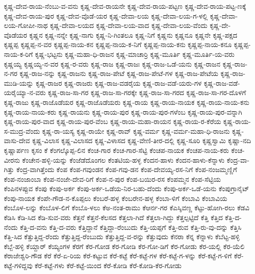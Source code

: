 ಕೃಷ್ಣ-ದೇವ-ರಾಯ-ನೆಂಬು-ವ-ವನು
ಕೃಷ್ಣ-ದೇವ-ರಾಯನೇ
ಕೃಷ್ಣ-ದೇವ-ರಾಯ-ಪಟ್ಟಣ
ಕೃಷ್ಣ-ದೇವ-ರಾಯ-ಪಟ್ಟ-ಣಕ್ಕೆ
ಕೃಷ್ಣ-ದೇವ-ರಾಯ-ಪುರ
ಕೃಷ್ಣ-ದೇವ-ವೊಡೆ-ಯರ
ಕೃಷ್ಣ-ದೇವಾ-ಲಯ
ಕೃಷ್ಣ-ದೇವಾ-ಲಯ-ಗ-ಳಲ್ಲಿ
ಕೃಷ್ಣ-ದೇವಾ-ಲಯ-ಗೋಪೀ-ನಾಥ
ಕೃಷ್ಣ-ದೇವಾ-ಲಯದ
ಕೃಷ್ಣ-ದೇವಾ-ಲಯ-ವಾದ
ಕೃಷ್ಣ-ದೇವಾ-ಲಯ-ವೆಂದು
ಕೃಷ್ಣ-ದೇ-ವೊಡೆಯರ
ಕೃಷ್ಣನ
ಕೃಷ್ಣ-ನನ್ನೇ
ಕೃಷ್ಣ-ನಾಗು
ಕೃಷ್ಣ-ನಿ-ಗಿಂತಲೂ
ಕೃಷ್ಣ-ನಿಗೆ
ಕೃಷ್ಣನು
ಕೃಷ್ಣನೂ
ಕೃಷ್ಣನೇ
ಕೃಷ್ಣ-ಪಕ್ಷದ
ಕೃಷ್ಣಪ್ಪ
ಕೃಷ್ಣಪ್ಪ-ನ-ವರ
ಕೃಷ್ಣಪ್ಪ-ನಾಯ-ಕನ
ಕೃಷ್ಣಪ್ಪ-ನಾಯ-ಕ-ನಿಗೆ
ಕೃಷ್ಣಪ್ಪ-ನಾಯ-ಕನು
ಕೃಷ್ಣಪ್ಪ-ನಾಯ-ಕನೂ
ಕೃಷ್ಣಪ್ಪ-ನಾಯ-ಕ-ರಿಗೆ
ಕೃಷ್ಣ-ಭಟ್ಟನು
ಕೃಷ್ಣ-ಮಹಾ-ಧಿ-ರಾಜನ
ಕೃಷ್ಣ-ಮಾಚಾರ್ರಿ
ಕೃಷ್ಣ-ಮೂರ್ತಿ
ಕೃಷ್ಣ-ಮೂರ್ತಿ-ಯ-ವರು
ಕೃಷ್ಣಯ್ಯ
ಕೃಷ್ಣಯ್ಯ-ನ-ವರ
ಕೃಷ್ಣ-ರ-ವರು
ಕೃಷ್ಣ-ರಾಜ
ಕೃಷ್ಣ-ರಾಜಃ
ಕೃಷ್ಣ-ರಾಜ-ಒಡೆ-ಯನು
ಕೃಷ್ಣ-ರಾಜನ
ಕೃಷ್ಣ-ರಾಜ-ನ-ಗರ
ಕೃಷ್ಣ-ರಾಜ-ನನ್ನು
ಕೃಷ್ಣ-ರಾಜನು
ಕೃಷ್ಣ-ರಾಜ-ಪೇಟೆ
ಕೃಷ್ಣ-ರಾಜ-ಪೇಟೆ-ಗಳ
ಕೃಷ್ಣ-ರಾಜ-ಪೇಟೆಯ
ಕೃಷ್ಣ-ರಾಜ-ಮುಡಿ-ಯನ್ನು
ಕೃಷ್ಣ-ರಾಜರ
ಕೃಷ್ಣ-ರಾಜರು
ಕೃಷ್ಣ-ರಾಜ-ವಡರೈಯ
ಕೃಷ್ಣ-ರಾಜ-ವಡೆ-ಯರು-ಗಳ
ಕೃಷ್ಣ-ರಾಜ-ವಡೆ-ಯರೈಯ್ಯಾ-ನ-ವರು
ಕೃಷ್ಣ-ರಾಜ-ಸಾ-ಗರ
ಕೃಷ್ಣ-ರಾಜ-ಸಾ-ಗರಕ್ಕೇ
ಕೃಷ್ಣ-ರಾಜ-ಸಾ-ಗರದ
ಕೃಷ್ಣ-ರಾಜ-ಸಾ-ಗರ-ದೊಳಗೆ
ಕೃಷ್ಣ-ರಾಜು
ಕೃಷ್ಣ-ರಾಜೊಡೆಯರ
ಕೃಷ್ಣ-ರಾಜೊಡೆಯರು
ಕೃಷ್ಣ-ರಾಯ
ಕೃಷ್ಣ-ರಾಯ-ನಾಯಕ
ಕೃಷ್ಣ-ರಾಯ-ನಾಯ-ಕನು
ಕೃಷ್ಣ-ರಾಯ-ನಾಯ-ಕರು
ಕೃಷ್ಣ-ರಾಯನು
ಕೃಷ್ಣ-ರಾಯ-ಪುರ
ಕೃಷ್ಣ-ರಾಯ-ಪುರ-ಗಳೆಂಬ
ಕೃಷ್ಣ-ರಾಯ-ಪುರ-ವನ್ನಾಗಿ
ಕೃಷ್ಣ-ರಾಯ-ಪುರ-ವಾದ
ಕೃಷ್ಣ-ರಾಯ-ಪುರ-ವೆಂಬ
ಕೃಷ್ಣ-ರಾಯ-ಮಹಾ-ರಾಯನ
ಕೃಷ್ಣ-ರಾಯ-ರ-ಕೆರೆಯ
ಕೃಷ್ಣ-ರಾಯ-ಸ-ಮುದ್ರ-ವೆಂದು
ಕೃಷ್ಣ-ರಾ-ಯಸ್ಯ
ಕೃಷ್ಣ-ರಾಯೇ
ಕೃಷ್ಣ-ರಾವ್
ಕೃಷ್ಣ-ವರ್ಮ
ಕೃಷ್ಣ-ವರ್ಮ-ಮಹಾ-ಧಿ-ರಾಜನು
ಕೃಷ್ಣ-ವಾಸು-ದೇವ
ಕೃಷ್ಣ-ವಿಲಾಸ
ಕೃಷ್ಣ-ವಿಲಾಸದ
ಕೃಷ್ಣ-ವಿಳಾಸದ
ಕೃಷ್ಣ-ವೇಣಿ-ತೀರ-ದಲ್ಲಿ
ಕೃಷ್ಣ-ಸೂರಿ
ಕೃಷ್ಣಸ್ವಾಮಿ
ಕೃಷ್ಣಾ-ನದಿ
ಕೃಷ್ಣಾರ್ಪಣ
ಕೃಸಂ
ಕೆ
ಕೆಂಗಲ್ಕೊಪ್ಪ-ಲಿನ
ಕೆಂಚ-ಗಾರ
ಕೆಂಚ-ಗಾರ-ಸೆಟ್ಟಿ
ಕೆಂಚಪ-ನಾಯಕ
ಕೆಂಚಪ-ನಾಯ-ಕರು
ಕೆಂಚ-ವೀರನು
ಕೆಂಚೇನ-ಹಳ್ಳಿ-ಯನ್ನು
ಕೆಂಜೆಡೆದೊಂಗಲ
ಕೆಂತಟಿಯ-ಹಳ್ಳ
ಕೆಂದನ-ಹಾಳು
ಕೆಂದನ-ಹಾಳು-ಕೆನ್ನಾಳು
ಕೆಂದ್ರ-ವಾ-ಗಿತ್ತು
ಕೆಂದ್ರ-ವಾಗಿತ್ತೆಂದು
ಕೆಂಪ
ಕೆಂಪ-ಗವುಂಡನ
ಕೆಂಪ-ಗವು-ಡನ
ಕೆಂಪ-ದೇವಯ್ಯ-ರಸ-ನಿಗೆ
ಕೆಂಪ-ನಂಜಮ್ಮಣ್ಣಿಗೆ
ಕೆಂಪ-ನಂಜಾಂಬಾ
ಕೆಂಪ-ನಂಜೇ-ದೇವ-ರಿಗೆ
ಕೆಂಪ-ನ-ಪುರ
ಕೆಂಪ-ಬಯಿರ-ರಸ
ಕೆಂಪಮ್ಮನ
ಕೆಂಪ-ಸೆಟ್ಟಿಯ
ಕೆಂಪಿನಳಪ್ಪುವ
ಕೆಂಪು
ಕೆಂಪು-ಅರ್ಕ
ಕೆಂಪು-ಅರ್ಕ-ಒಡೆಯ-ನಿರ-ಬಹು-ದೆಂದು
ಕೆಂಪು-ಅರ್ಕ-ಒಡೆ-ಯನು
ಕೆಂಪುಗ್ರಾನೈಟ್
ಕೆಂಪು-ನಾಯಕ
ಕೆಂಪೇ-ಗೌಡ-ನ-ಕೊಪ್ಪಲು
ಕೆಂಬರೆ-ಹಳ್ಳ
ಕೆಂಬರೇನ-ಹಳ್ಳ
ಕೆಂಬಾ-ಳಿಗೆ
ಕೆಂಬಾವಿ
ಕೆಂಬಾವಿಯ
ಕೆಂಬೊಳ-ಲನ್ನು
ಕೆಂಬೊಳ-ಲಿಗೆ
ಕೆಂಬೊ-ಳಲು
ಕೆಅ-ನಂತ-ರಾಮು
ಕೆಆರ್ನ-ಗರ
ಕೆಎಸ್ಶಿವಣ್ಣ
ಕೆಟ್ಟು-ಹೋಗಿ-ರಲು
ಕೆಡವಿ
ಕೆಡಿಸಿ
ಕೆಡಿ-ಸಿದ
ಕೆಡಿ-ಸುವ-ವರು
ಕೆತ್ತನೆ
ಕೆತ್ತನೆ-ಕೆಲಸದ
ಕೆತ್ತಲಾ-ಗಿದೆ
ಕೆತ್ತಲಾ-ಗಿದ್ದು
ಕೆತ್ತಲ್ಪಟ್ಟಿದೆ
ಕೆತ್ತಿ
ಕೆತ್ತಿದ
ಕೆತ್ತಿ-ದ-ನೆಂದು
ಕೆತ್ತಿ-ದ-ವನು
ಕೆತ್ತಿ-ದ-ವರು
ಕೆತ್ತಿದ್ದಾನೆ
ಕೆತ್ತಿದ್ದಾ-ರೆಂಬುದು
ಕೆತ್ತಿ-ಯಪ್ಪಗೆ
ಕೆತ್ತಿ-ರುವ
ಕೆತ್ತಿ-ರು-ವು-ದನ್ನು
ಕೆತ್ತಿಸಿ
ಕೆತ್ತಿ-ಸಿದ
ಕೆತ್ತುತ್ತಿದ್ದ-ರೆಂದು
ಕೆತ್ತುತ್ತಿದ್ದ-ರೆಂಬುದು
ಕೆತ್ತುತ್ತಿದ್ದ-ವ-ರನ್ನು
ಕೆತ್ತುವುದು
ಕೆನರಾ
ಕೆನ್ನ
ಕೆನ್ನಾಳು
ಕೆಬೆಟ್ಟ-ಹಳ್ಳಿ
ಕೆಬ್ಬೆ-ಹಳ್ಳಿ
ಕೆಯ್ದಾರ್
ಕೆಯ್ಯಂಗಳ
ಕೆರಗೆ
ಕೆರ-ಗೋಡ
ಕೆರ-ಗೋಡಿ
ಕೆರ-ಗೋ-ಡಿಗೆ
ಕೆರ-ಗೋಡು
ಕೆರ-ಯಲ್ಲಿ
ಕೆರ-ಯೆಲಿ
ಕೆರಾಜೇಶ್ವರಿ-ಗೌಡ
ಕೆರೆ
ಕೆರೆ-ಏ-ರಿಯ
ಕೆರೆ-ಕಟ್ಟುವ
ಕೆರೆ-ಕಟ್ಟೆ
ಕೆರೆ-ಕಟ್ಟೆ-ಗಳ
ಕೆರೆ-ಕಟ್ಟೆ-ಗ-ಳನ್ನು
ಕೆರೆ-ಕಟ್ಟೆ-ಗ-ಳಿಗೆ
ಕೆರೆ-ಕಟ್ಟೆ-ಗಳಿದ್ದವು
ಕೆರೆ-ಕಟ್ಟೆ-ಗಳು
ಕೆರೆ-ಕಟ್ಟೆ-ಯಿಂದ
ಕೆರೆ-ಕೋಡಿ
ಕೆರೆ-ಕೋಡಿ-ಕೆರ-ಗೋಡು
